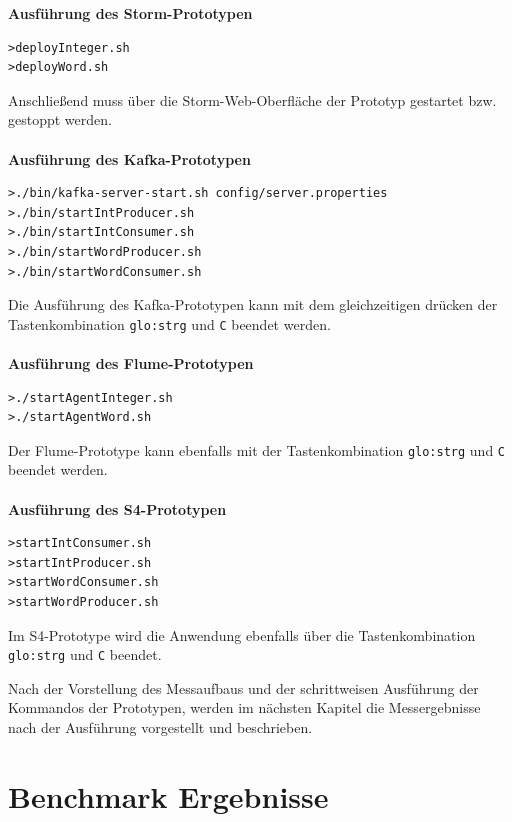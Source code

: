 \textbf{Ausführung des Storm-Prototypen}

\begin{verbatim}
>deployInteger.sh
>deployWord.sh
\end{verbatim}

Anschließend muss über die Storm-Web-Oberfläche der Prototyp gestartet bzw. gestoppt werden.\\\\


\textbf{Ausführung des Kafka-Prototypen}

\begin{verbatim}
>./bin/kafka-server-start.sh config/server.properties
>./bin/startIntProducer.sh
>./bin/startIntConsumer.sh
>./bin/startWordProducer.sh
>./bin/startWordConsumer.sh
\end{verbatim}

Die Ausführung des Kafka-Prototypen kann mit dem gleichzeitigen drücken der Tastenkombination \texttt{\gls{glo:strg}} und \texttt{C} beendet werden.\\\\


\textbf{Ausführung des Flume-Prototypen}

\begin{verbatim}
>./startAgentInteger.sh
>./startAgentWord.sh
\end{verbatim}

Der Flume-Prototype kann ebenfalls mit der Tastenkombination \texttt{\gls{glo:strg}} und \texttt{C} beendet werden.\\\\


\textbf{Ausführung des S4-Prototypen}

\begin{verbatim}
>startIntConsumer.sh
>startIntProducer.sh
>startWordConsumer.sh
>startWordProducer.sh
\end{verbatim}

Im S4-Prototype wird die Anwendung ebenfalls über die Tastenkombination \texttt{\gls{glo:strg}} und \texttt{C} beendet.

Nach der Vorstellung des Messaufbaus und der schrittweisen Ausführung der Kommandos der Prototypen, werden im nächsten Kapitel die Messergebnisse nach der Ausführung vorgestellt und beschrieben.


\section{Benchmark Ergebnisse}
\label{sec:benchmarkErgebnisse}

